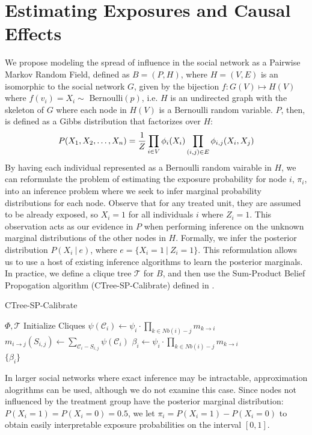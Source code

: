 \documentclass{article}
\begin{document}
\section{Estimating Exposures and Causal Effects}

We propose modeling the spread of influence in the social network as a Pairwise Markov Random Field, defined as $B = (P, H)$, where $H = (V, E)$ is an isomorphic to the social network $G$, given by the bijection $f: G(V) \mapsto H(V)$ where $f(v_i) = X_i \sim $ Bernoulli$(p)$, i.e. $H$ is an undirected graph with the skeleton of $G$ where each node in $H(V)$ is a Bernoulli random variable. 
$P$, then, is defined as a Gibbs distribution that factorizes over $H$: \\
\begin{displaymath}
  P(X_1, X_2, \dots, X_n) = \frac{1}{Z}\prod_{i \in V} \phi_i(X_i)\prod_{(i, j) \in E}\phi_{i,j}(X_i, X_j) \\[0.5ex]
\end{displaymath}
By having each individual represented as a Bernoulli random vairable in $H$, we can reformulate the problem of estimating the exposure probability for node $i$,  $\pi_i$, into 
an inference problem where we seek to infer marginal probability distributions for each node. Observe that for any treated unit, they are assumed to be already exposed, so $X_i = 1$ for all individuals $i$ where $Z_i = 1$. 
This observation acts as our evidence in $P$ when performing inference on the unknown marginal distributions of the other nodes in $H$. Formally, we infer the posterior distribution $P(X_i\ |\ e)$, where $e = \{X_i = 1\ |\ Z_i = 1\}$. 
This reformulation allows us to use a host of existing inference algorithms to learn the posterior marginals. In practice, we define a clique tree $\mathcal{T}$ for $B$, and then use the Sum-Product Belief Propogation algorithm (CTree-SP-Calibrate) defined in \cite{koller}. 
\begin{algorithm}[h]
  \caption{CTree-SP-Calibrate}
   \begin{algorithmic}[1]
       \Require $\Phi, \mathcal{T}$
       \State Initialize Cliques
       \State $\psi(\mathcal{C}_i) \leftarrow \psi_i \cdot \prod_{k \in Nb(i) - j}m_{k \rightarrow i}$
       \State $m_{i \rightarrow j}(S_{i,j}) \leftarrow \sum_{\mathcal{C}_i - S_{i,j}}\psi(\mathcal{C}_i)$
       \EndWhile
       \State $\beta_i \leftarrow \psi_i \cdot \prod_{k \in Nb(i) - j}m_{k \rightarrow i}$
       \EndFor \\

       \Return $\{\beta_i\}$
\end{algorithmic}
\end{algorithm}
In larger social networks where exact inference may be intractable, 
approximation alogrithms can be used, although we do not examine this case. Since nodes not influenced by the treatment group have the posterior marginal distribution: $P(X_i = 1) = P(X_i = 0) = 0.5$, we let $\pi_i = P(X_i = 1) - P(X_i = 0)$ to obtain easily interpretable exposure probabilities on the interval $[0, 1]$.
\end{document}
